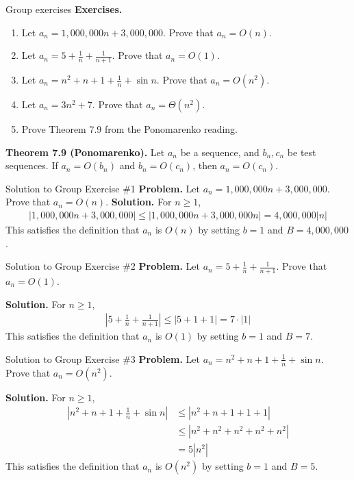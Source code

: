 \documentclass[10pt]{beamer}
\begin{document}
\begin{frame}{Group exercises}
\colorbox{green!30}{\textbf{Exercises.}}
\begin{enumerate}
	\item  Let $a_n = 1,000,000n + 3,000,000$. Prove that $a_n = O(n)$.
	\item Let $a_n = 5 + \frac{1}{n} + \frac{1}{n+1}$. Prove that $a_n = O(1)$.
	\item Let $a_n = n^2 + n + 1 + \frac{1}{n} + \sin n$. Prove that $a_n = O(n^2)$.
	\item Let $a_n = 3n^2 + 7$. Prove that $a_n = \Theta (n^2)$.
	\item Prove Theorem 7.9 from the Ponomarenko reading. 
\end{enumerate}

\vfill
\colorbox{red!30}{\textbf{Theorem 7.9 (Ponomarenko).}} Let $a_n$ be a sequence, and $b_n,c_n$ be test sequences.  If $a_n = O(b_n)$ and $b_n = O(c_n)$, then $a_n = O(c_n)$.
\end{frame}


\begin{frame}{Solution to Group Exercise \#1}
\textbf{Problem.} Let $a_n = 1,000,000n + 3,000,000$. Prove that $a_n = O(n)$.
\vfill 
\textbf{Solution.}
%
For $n \geq 1$,
\begin{align*}
|1,000,000n + 3,000,000| \leq |1,000,000n + 3,000,000n| = 4,000,000 |n| 
\end{align*}
This satisfies the definition that  $a_n$ is $O(n)$ by setting $b=1$ and $B= 4,000,000$. 
\end{frame}

\begin{frame}{Solution to Group Exercise \#2}
\textbf{Problem.} Let $a_n = 5 + \frac{1}{n} + \frac{1}{n+1}$. Prove that $a_n = O(1)$.

\vfill 
\textbf{Solution.}
%
For $n \geq 1$,
\begin{align*}
|5 + \frac{1}{n} + \frac{1}{n+1}| \leq |5 + 1 + 1| = 7 \cdot |1| 
\end{align*}
This satisfies the definition that  $a_n$ is $O(1)$ by setting $b=1$ and $B=7$. 
\end{frame}

\begin{frame}{Solution to Group Exercise \#3}
\textbf{Problem.} Let $a_n = n^2 + n + 1 + \frac{1}{n} + \sin n$. Prove that $a_n = O(n^2)$.

\vfill 
\textbf{Solution.}
%
For $n \geq 1$,
\begin{align*}
|n^2 + n + 1 + \frac{1}{n} + \sin n| &\leq |n^2 + n + 1 + 1 + 1| \\
& \leq |n^2 + n^2  + n^2  + n^2  + n^2 | \\
&= 5 |n^2|
\end{align*}
This satisfies the definition that  $a_n$ is $O(n^2)$ by setting $b=1$ and $B=5$. 
\end{frame}
\end{document}
